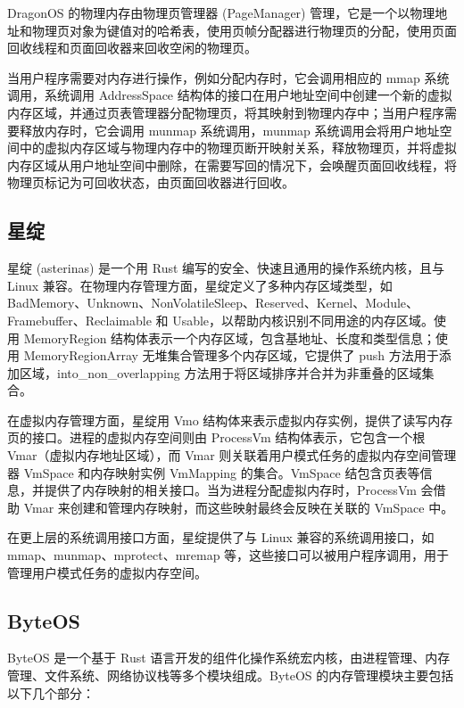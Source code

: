 DragonOS 的物理内存由物理页管理器 (PageManager) 管理，它是一个以物理地址和物理页对象为键值对的哈希表，使用页帧分配器进行物理页的分配，使用页面回收线程和页面回收器来回收空闲的物理页。

当用户程序需要对内存进行操作，例如分配内存时，它会调用相应的 mmap 系统调用，系统调用 AddressSpace 结构体的接口在用户地址空间中创建一个新的虚拟内存区域，并通过页表管理器分配物理页，将其映射到物理内存中；当用户程序需要释放内存时，它会调用 munmap 系统调用，munmap 系统调用会将用户地址空间中的虚拟内存区域与物理内存中的物理页断开映射关系，释放物理页，并将虚拟内存区域从用户地址空间中删除，在需要写回的情况下，会唤醒页面回收线程，将物理页标记为可回收状态，由页面回收器进行回收。

\subsection{星绽}

星绽 (asterinas) 是一个用 Rust 编写的安全、快速且通用的操作系统内核，且与 Linux 兼容。在物理内存管理方面，星绽定义了多种内存区域类型，如 BadMemory、Unknown、NonVolatileSleep、Reserved、Kernel、Module、Framebuffer、Reclaimable 和 Usable，以帮助内核识别不同用途的内存区域。使用 MemoryRegion 结构体表示一个内存区域，包含基地址、长度和类型信息；使用 MemoryRegionArray 无堆集合管理多个内存区域，它提供了 push 方法用于添加区域，into\_non\_overlapping 方法用于将区域排序并合并为非重叠的区域集合。

在虚拟内存管理方面，星绽用 Vmo 结构体来表示虚拟内存实例，提供了读写内存页的接口。进程的虚拟内存空间则由 ProcessVm 结构体表示，它包含一个根 Vmar（虚拟内存地址区域），而 Vmar 则关联着用户模式任务的虚拟内存空间管理器 VmSpace 和内存映射实例 VmMapping 的集合。VmSpace 结包含页表等信息，并提供了内存映射的相关接口。当为进程分配虚拟内存时，ProcessVm 会借助 Vmar 来创建和管理内存映射，而这些映射最终会反映在关联的 VmSpace 中。

在更上层的系统调用接口方面，星绽提供了与 Linux 兼容的系统调用接口，如 mmap、munmap、mprotect、mremap 等，这些接口可以被用户程序调用，用于管理用户模式任务的虚拟内存空间。

\subsection{ByteOS}

ByteOS 是一个基于 Rust 语言开发的组件化操作系统宏内核，由进程管理、内存管理、文件系统、网络协议栈等多个模块组成。ByteOS 的内存管理模块主要包括以下几个部分：

